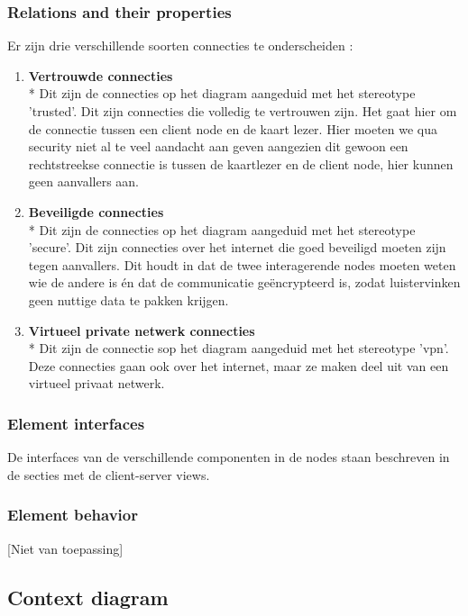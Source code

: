 \documentclass[a4paper,10pt]{article}
\begin{document}
\subsubsection{Relations and their properties}
\label{subsubsec:relations_deployment}
Er zijn drie verschillende soorten connecties te onderscheiden : 
\begin{enumerate}
 \item \textbf{Vertrouwde connecties}\\*
Dit zijn de connecties op het diagram aangeduid met het stereotype 'trusted'. Dit zijn connecties die volledig te vertrouwen zijn. Het gaat hier om de connectie tussen een client node en de kaart lezer. Hier moeten we qua security niet al te veel aandacht aan geven aangezien dit gewoon een rechtstreekse connectie is tussen de kaartlezer en de client node, hier kunnen geen aanvallers aan. 
\item \textbf{Beveiligde connecties}\\*
Dit zijn de connecties op het diagram aangeduid met het stereotype 'secure'. Dit zijn connecties over het internet die goed beveiligd moeten zijn tegen aanvallers. Dit houdt in dat de twee interagerende nodes moeten weten wie de andere is én dat de communicatie geëncrypteerd is, zodat luistervinken geen nuttige data te pakken krijgen.
\item \textbf{Virtueel private netwerk connecties}\\*
Dit zijn de connectie sop het diagram aangeduid met het stereotype 'vpn'. Deze connecties gaan ook over het internet, maar ze maken deel uit van een virtueel privaat netwerk.
\end{enumerate}

\subsubsection{Element interfaces}

De interfaces van de verschillende componenten in de nodes staan beschreven in de secties met de client-server views.

\subsubsection{Element behavior}
[Niet van toepassing]

\subsection{Context diagram}
\end{document}
